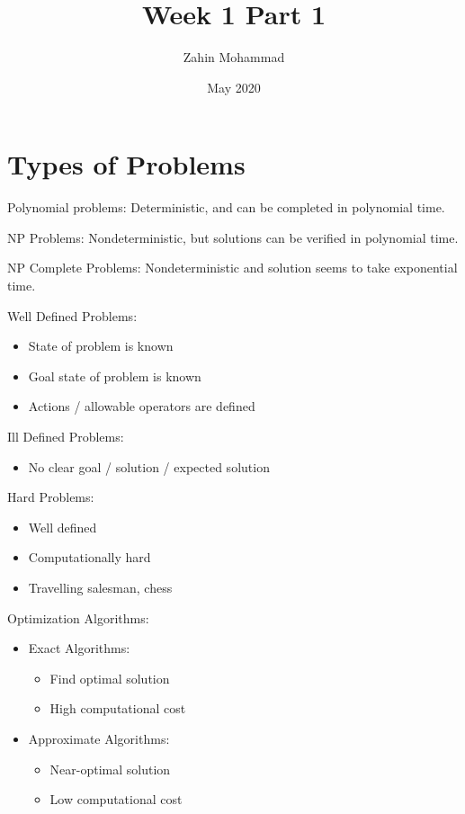 \documentclass{article}
\title{Week 1 Part 1}
\author{Zahin Mohammad}
\date{May 2020}
\begin{document}
\maketitle

\section{Types of Problems}
Polynomial problems: Deterministic, and can be completed in polynomial time.
\setlength{\parskip}{6pt}

NP Problems: Nondeterministic, but solutions can be verified in polynomial time.
\setlength{\parskip}{6pt}

NP Complete Problems: Nondeterministic and solution seems to take exponential time.
\setlength{\parskip}{6pt}

Well Defined Problems:
\begin{itemize}
    \item State of problem is known
    \item Goal state of problem is known
    \item Actions / allowable operators are defined
\end{itemize}

Ill Defined Problems:
\begin{itemize}
    \item No clear goal / solution / expected solution
\end{itemize}

Hard Problems:
\begin{itemize}
    \item Well defined
    \item Computationally hard
    \item Travelling salesman, chess
\end{itemize}

Optimization Algorithms:
\begin{itemize}
    \item Exact Algorithms:
    \begin{itemize}
        \item Find optimal solution
        \item High computational cost
    \end{itemize}
    \item Approximate Algorithms:
    \begin{itemize}
        \item Near-optimal solution
        \item Low computational cost
    \end{itemize}
\end{itemize}


\printbibliography[title={Referências}]
\end{document}
